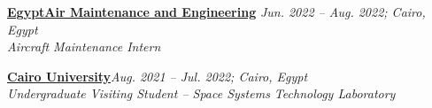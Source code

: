 \textbf{\href{http://www.egyptair-me.com/home/home.htm}{EgyptAir Maintenance and Engineering}} \hfill \textit{Jun. 2022 – Aug. 2022; Cairo, Egypt}\\
\textit{Aircraft Maintenance Intern}

\textbf{\href{https://aer.eng.cu.edu.eg/en/}{Cairo University}}\hfill  \textit{Aug. 2021 – Jul. 2022; Cairo, Egypt}\\
\textit{Undergraduate Visiting Student – Space Systems Technology Laboratory}
